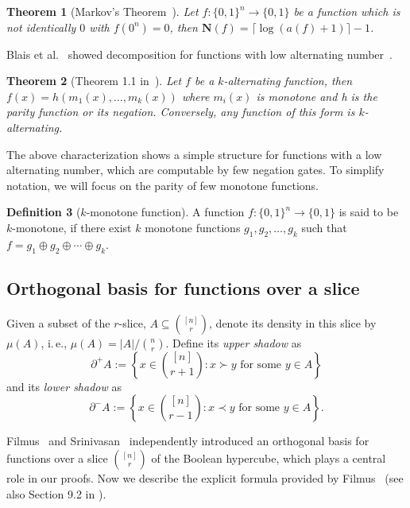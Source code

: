 \documentclass[11pt]{article}
\numberwithin{equation}{section}
\newtheorem{theorem}{Theorem}[section]
\theoremstyle{definition}
\newtheorem{definition}[theorem]{Definition}
\theoremstyle{plain}
\newcommand{\ie}{i.\,e.}
\begin{document}
\begin{theorem}[Markov's Theorem~\cite{Mark}]\label{thm:markov}
Let $f:\{0,1\}^n \rightarrow \{0, 1\}$ be a function which is not identically $0$ with $f(0^n) = 0$,
then $\mathbf{N}(f) = \lceil\log(a(f) + 1)\rceil - 1$.
\end{theorem}

Blais et al.~\cite{BCOST15} showed decomposition for functions with low alternating number~\cite{BCOST15}.
\begin{theorem}[Theorem 1.1 in~\cite{BCOST15}]
Let $f$ be a $k$-alternating function, then $f(x) = h(m_1(x),\dots, m_k(x))$
where $m_i(x)$ is monotone and h is the parity function or its negation. Conversely, any
function of this form is $k$-alternating.
\end{theorem}

The above characterization shows a simple structure for functions with a low alternating number,
which are computable by few negation gates.
To simplify notation, %
we will %
focus on the parity of few monotone functions.

\begin{definition} [$k$-monotone function]
A function $f:\{0,1\}^n\rightarrow\{0,1\}$ is said to be $k$-monotone, if there exist
$k$ monotone functions $g_1, g_2, \dots, g_k$ such that $f = g_1 \oplus g_2 \oplus \cdots \oplus g_k$. 

\end{definition}

\subsection{Orthogonal basis for functions over a slice}
%
%
%
%
Given a subset of the $r$-slice, $A\subseteq \binom{[n]}{r}$, %
denote its density in this slice by $\mu(A)$, \ie, 
%
$\mu(A)=|A|/\binom{n}{r}$. %
%
%
Define its \emph{upper shadow}  %
as
%
\begin{equation} %
%
\partial^+ A:=\left\{x\in
%
\binom{[n]}{r+1} %
:x\succ y \text{ for some }y\in A\right\} %
%
\end{equation} %
%
and its \emph{lower shadow} as  %
%
\begin{equation} %
%
\partial^- A:=\left\{x\in
%
\binom{[n]}{r-1} %
:x\prec y \text{ for some } y\in A\right\}. %
%
\end{equation} %

Filmus~\cite{Filmus} and Srinivasan~\cite{srinivasan2011symmetric} independently 
introduced an orthogonal basis for functions over a
%
slice 
%
$\binom{[n]}{r}$ %
of the Boolean hypercube,   %
which plays a central role in our proofs. 
%
Now we describe the explicit formula provided by Filmus~\cite{Filmus} (see also Section 9.2 in \cite{FilmusM16}). %
%
%
%
%
\end{document}
